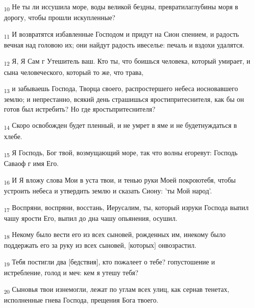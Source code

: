 \begin{tcolorbox}
\textsubscript{10} Не ты ли иссушила море, воды великой бездны, превратилаглубины моря в дорогу, чтобы прошли искупленные?
\end{tcolorbox}
\begin{tcolorbox}
\textsubscript{11} И возвратятся избавленные Господом и придут на Сион спением, и радость вечная над головою их; они найдут радость ивеселье: печаль и вздохи удалятся.
\end{tcolorbox}
\begin{tcolorbox}
\textsubscript{12} Я, Я Сам г Утешитель ваш. Кто ты, что боишься человека, который умирает, и сына человеческого, который то же, что трава,
\end{tcolorbox}
\begin{tcolorbox}
\textsubscript{13} и забываешь Господа, Творца своего, распростершего небеса иосновавшего землю; и непрестанно, всякий день страшишься яростипритеснителя, как бы он готов был истребить? Но где яростьпритеснителя?
\end{tcolorbox}
\begin{tcolorbox}
\textsubscript{14} Скоро освобожден будет пленный, и не умрет в яме и не будетнуждаться в хлебе.
\end{tcolorbox}
\begin{tcolorbox}
\textsubscript{15} Я Господь, Бог твой, возмущающий море, так что волны егоревут: Господь Саваоф г имя Его.
\end{tcolorbox}
\begin{tcolorbox}
\textsubscript{16} И Я вложу слова Мои в уста твои, и тенью руки Моей покроютебя, чтобы устроить небеса и утвердить землю и сказать Сиону: 'ты Мой народ'.
\end{tcolorbox}
\begin{tcolorbox}
\textsubscript{17} Воспряни, воспряни, восстань, Иерусалим, ты, который изруки Господа выпил чашу ярости Его, выпил до дна чашу опьянения, осушил.
\end{tcolorbox}
\begin{tcolorbox}
\textsubscript{18} Некому было вести его из всех сыновей, рожденных им, инекому было поддержать его за руку из всех сыновей, [которых] онвозрастил.
\end{tcolorbox}
\begin{tcolorbox}
\textsubscript{19} Тебя постигли два [бедствия], кто пожалеет о тебе? гопустошение и истребление, голод и меч: кем я утешу тебя?
\end{tcolorbox}
\begin{tcolorbox}
\textsubscript{20} Сыновья твои изнемогли, лежат по углам всех улиц, как сернав тенетах, исполненные гнева Господа, прещения Бога твоего.
\end{tcolorbox}
